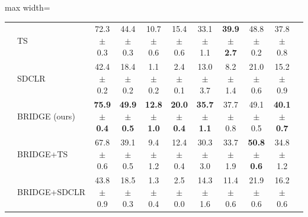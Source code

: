 \begin{table}[t]
\begin{adjustbox}{max width=\textwidth}
\begin{tabular}{l l c c c c c c c c c}
 & TS & 72.3 {\scriptsize$\pm$ 0.3} & 44.4 {\scriptsize$\pm$ 0.3} & 10.7 {\scriptsize$\pm$ 0.6} & 15.4 {\scriptsize$\pm$ 0.6} & 33.1 {\scriptsize$\pm$ 1.1} & \textbf{39.9 {\scriptsize$\pm$ 2.7}} & 48.8 {\scriptsize$\pm$ 0.2} & 37.8 {\scriptsize$\pm$ 0.8} \\
 & SDCLR & 42.4 {\scriptsize$\pm$ 0.2} & 18.4 {\scriptsize$\pm$ 0.2} & 1.1 {\scriptsize$\pm$ 0.2} & 2.4 {\scriptsize$\pm$ 0.1} & 13.0 {\scriptsize$\pm$ 3.7} & 8.2 {\scriptsize$\pm$ 1.4} & 21.0 {\scriptsize$\pm$ 0.6} & 15.2 {\scriptsize$\pm$ 0.9} \\
 & \rowcolor{blue!10} BRIDGE (ours) & \textbf{75.9 {\scriptsize$\pm$ 0.4}} & \textbf{49.9 {\scriptsize$\pm$ 0.5}} & \textbf{12.8 {\scriptsize$\pm$ 1.0}} & \textbf{20.0 {\scriptsize$\pm$ 0.4}} & \textbf{35.7 {\scriptsize$\pm$ 1.1}} & 37.7 {\scriptsize$\pm$ 0.8} & 49.1 {\scriptsize$\pm$ 0.5} & \textbf{40.1 {\scriptsize$\pm$ 0.7}} \\
 & BRIDGE+TS & 67.8 {\scriptsize$\pm$ 0.6} & 39.1 {\scriptsize$\pm$ 0.5} & 9.4 {\scriptsize$\pm$ 1.2} & 12.4 {\scriptsize$\pm$ 0.4} & 30.3 {\scriptsize$\pm$ 3.0} & 33.7 {\scriptsize$\pm$ 1.9} & \textbf{50.8 {\scriptsize$\pm$ 0.6}} & 34.8 {\scriptsize$\pm$ 1.2} \\
 & BRIDGE+SDCLR & 43.8 {\scriptsize$\pm$ 0.9} & 18.5 {\scriptsize$\pm$ 0.3} & 1.3 {\scriptsize$\pm$ 0.4} & 2.5 {\scriptsize$\pm$ 0.0} & 14.3 {\scriptsize$\pm$ 1.6} & 11.4 {\scriptsize$\pm$ 0.6} & 21.9 {\scriptsize$\pm$ 0.6} & 16.2 {\scriptsize$\pm$ 0.6} \\
\bottomrule
\end{tabular}
\end{adjustbox}
\end{table}
